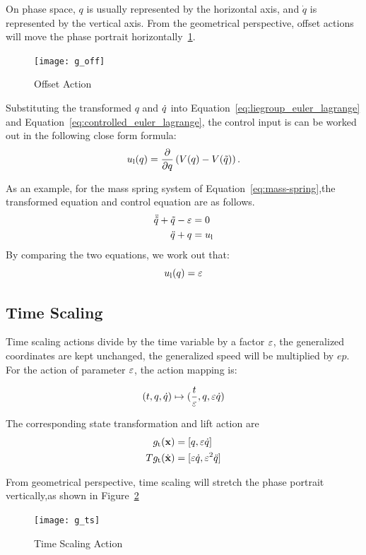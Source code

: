 On phase space,  $q$ is usually represented by the horizontal axis, and $\dot{q}$ is represented by the vertical axis.
From the geometrical perspective, offset actions will move the phase portrait horizontally~\ref{fig:goff}.

\begin{figure}[!htbp]
  \begin{center}
      \texttt{[image: g\_off]}
    \caption{Offset Action}
    \label{fig:goff}
\end{center}
\end{figure}

Substituting the transformed $q$ and $\dot{q}$ into Equation~\ref{eq:liegroup_euler_lagrange} and Equation~\ref{eq:controlled_euler_lagrange},
the control input is can be worked out in the following close form formula:
\begin{equation}
u_{\mathrm{l}}(q) = \frac{\partial}{\partial q} \left(V(q)-V(\tilde{q}) \right).
\end{equation}

As an example, for the mass spring system of Equation~\ref{eq:mass-spring},the transformed equation  and control equation are as follows.
\begin{align}
\ddot{\tilde{q}}+\tilde{q}-\varepsilon&=0 \nonumber \\
\ddot{q}+q&=u_{\mathrm{l}} \nonumber
\end{align}
By comparing the two equations, we work out that:
\[
u_{\mathrm{l}}(q)=\varepsilon
\]




\subsection*{Time Scaling}

Time scaling actions divide by the time variable by a factor $\varepsilon$, the generalized coordinates are kept unchanged, the generalized speed will be multiplied by $ep$.
For the action of parameter $\varepsilon$, the action mapping is: 


\[
(t,q,\dot{q}) \mapsto (\frac{t}{\varepsilon},q,\varepsilon \dot{q})
\]

The corresponding state transformation and lift action are
\begin{align}
g_{\mathrm{t}}(\mathbf{x})&=[q,\varepsilon \dot{q}] \nonumber \\
Tg_{\mathrm{t}}(\dot{\mathbf{x}})&=[\varepsilon \dot{q},\varepsilon^2 \ddot{q}]\nonumber
\end{align}

From geometrical perspective, time scaling will stretch the phase portrait vertically,as shown in Figure~\ref{fig:gts}
\begin{figure}[!htbp]
  \begin{center}
    \texttt{[image: g\_ts]}
	 \caption{Time Scaling Action}
    \label{fig:gts}
\end{center}
\end{figure}

